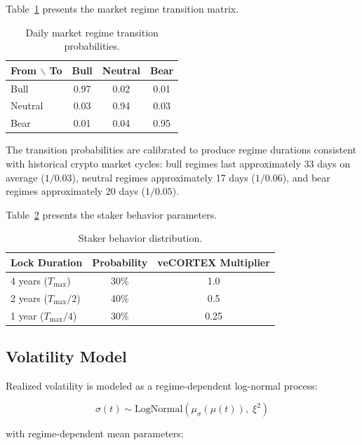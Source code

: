 Table~\ref{tab:sim-regime} presents the market regime transition matrix.

\begin{table}[H]
\centering
\caption{Daily market regime transition probabilities.}
\label{tab:sim-regime}
\begin{tabular}{@{}lccc@{}}
\toprule
\textbf{From $\backslash$ To} & \textbf{Bull} & \textbf{Neutral} & \textbf{Bear} \\
\midrule
Bull & 0.97 & 0.02 & 0.01 \\
Neutral & 0.03 & 0.94 & 0.03 \\
Bear & 0.01 & 0.04 & 0.95 \\
\bottomrule
\end{tabular}
\end{table}

The transition probabilities are calibrated to produce regime durations
consistent with historical crypto market cycles: bull regimes last
approximately 33 days on average ($1/0.03$), neutral regimes approximately
17 days ($1/0.06$), and bear regimes approximately 20 days ($1/0.05$).

Table~\ref{tab:sim-staker} presents the staker behavior parameters.

\begin{table}[H]
\centering
\caption{Staker behavior distribution.}
\label{tab:sim-staker}
\begin{tabular}{@{}lcc@{}}
\toprule
\textbf{Lock Duration} & \textbf{Probability} & \textbf{veCORTEX Multiplier} \\
\midrule
4 years ($T_{\max}$) & 30\% & 1.0 \\
2 years ($T_{\max}/2$) & 40\% & 0.5 \\
1 year ($T_{\max}/4$) & 30\% & 0.25 \\
\bottomrule
\end{tabular}
\end{table}

\subsection{Volatility Model}
\label{subsec:sim-vol}

Realized volatility is modeled as a regime-dependent log-normal process:

\begin{equation}
  \sigma(t) \sim \text{LogNormal}(\mu_\sigma(\mu(t)),\; \xi^2)
\end{equation}

with regime-dependent mean parameters:

